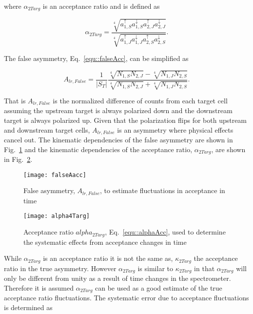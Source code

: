 \noindent
where $\alpha_{2Targ}$ is an acceptance ratio and is defined as

\begin{equation} \label{equ::alphaAcc}
  \alpha_{2Targ} =
  \frac{ \sqrt[4]{ a^\uparrow_{1,S}a^\downarrow_{1,S}
      a^\uparrow_{2,J}a^\downarrow_{2,J}}
  }{
    \sqrt[4]{
      a^\uparrow_{1,J} a^\downarrow_{1,J}
      a^\uparrow_{2,S} a^\downarrow_{2,S}
    }
  }.
\end{equation}

\noindent
The false asymmetry, Eq.~\ref{equ::falseAcc}, can be simplified as

\begin{equation}
  A_{lr,False} = 
  \frac{1}{|S_T|}
  \frac{
    \sqrt[4]{ N_{1, S} N_{2, J} }
    - \sqrt[4]{ N_{1, J} N_{2, S} }
  }{
    \sqrt[4]{ N_{1, S} N_{2, J} }
    + \sqrt[4]{ N_{1, J} N_{2, S} }
  }.
\end{equation}

\noindent
That is $A_{lr,False}$ is the normalized difference of counts from each
target cell assuming the upstream target is always polarized down and the
downstream target is always polarized up.  Given that the polarization flips for
both upstream and downstream target cells, $A_{lr,False}$ is an
asymmetry where physical effects cancel out.  The kinematic dependencies of the
false asymmetry are shown in Fig.~\ref{fig::falseAacc} and the kinematic
dependencies of the acceptance ratio, $\alpha_{2Targ}$, are shown in
Fig.~\ref{fig::alpha}.

\begin{figure}[h!t]
  \begin{center}
    \texttt{[image: falseAacc]}
    \caption{False asymmetry, $A_{lr,False}$, to estimate fluctuations in
      acceptance in time}
    \label{fig::falseAacc}
  \end{center}
\end{figure}

\begin{figure}[h!t]
  \begin{center}
    \texttt{[image: alpha4Targ]}
    \caption{Acceptance ratio $alpha_{2Targ}$, Eq.~\ref{equ::alphaAcc}, used to
      determine the systematic effects from acceptance changes in time}
    \label{fig::alpha}
  \end{center}
\end{figure}

While $\alpha_{2Targ}$ is an acceptance ratio it is not the same as,
$\kappa_{2Targ}$ the acceptance ratio in the true asymmetry.  However
$\alpha_{2Targ}$ is similar to $\kappa_{2Targ}$ in that $\alpha_{2Targ}$ will
only be different from unity as a result of time changes in the spectrometer.
Therefore it is assumed $\alpha_{2Targ}$ can be used as a good estimate of the
true acceptance ratio fluctuations.  The systematic error due to acceptance
fluctuations is determined as

